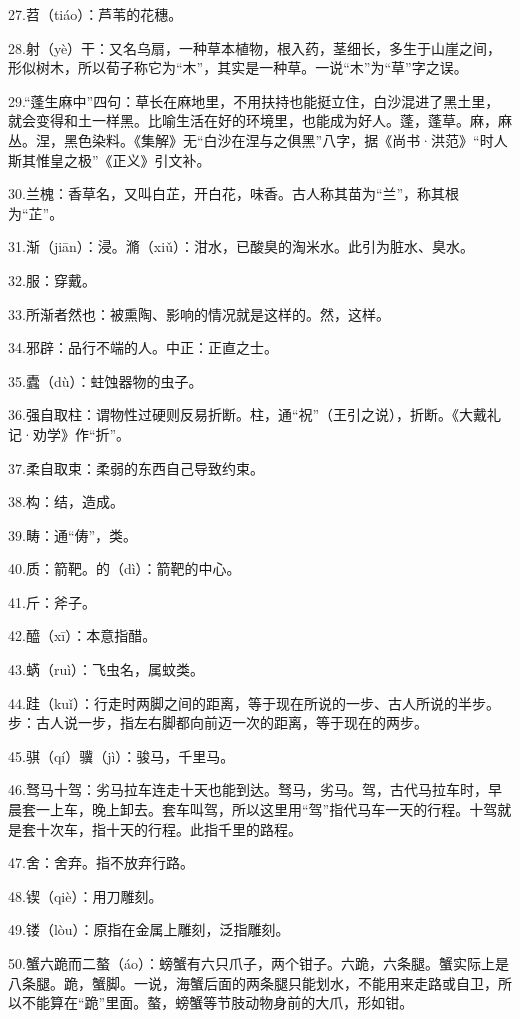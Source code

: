 \documentclass[letterpaper,12pt,english]{sphinxmanual}
\begin{document}
27.苕（tiáo）：芦苇的花穗。

28.射（yè）干：又名乌扇，一种草本植物，根入药，茎细长，多生于山崖之间，形似树木，所以荀子称它为“木”，其实是一种草。一说“木”为“草”字之误。

29.“蓬生麻中”四句：草长在麻地里，不用扶持也能挺立住，白沙混进了黑土里，就会变得和土一样黑。比喻生活在好的环境里，也能成为好人。蓬，蓬草。麻，麻丛。涅，黑色染料。《集解》无“白沙在涅与之俱黑”八字，据《尚书·洪范》“时人斯其惟皇之极”《正义》引文补。

30.兰槐：香草名，又叫白芷，开白花，味香。古人称其苗为“兰”，称其根为“芷”。

31.渐（jiān）：浸。滫（xiǔ）：泔水，已酸臭的淘米水。此引为脏水、臭水。

32.服：穿戴。

33.所渐者然也：被熏陶、影响的情况就是这样的。然，这样。

34.邪辟：品行不端的人。中正：正直之士。

35.蠹（dù）：蛀蚀器物的虫子。

36.强自取柱：谓物性过硬则反易折断。柱，通“祝”（王引之说），折断。《大戴礼记·劝学》作“折”。

37.柔自取束：柔弱的东西自己导致约束。

38.构：结，造成。

39.畴：通“俦”，类。

40.质：箭靶。的（dì）：箭靶的中心。

41.斤：斧子。

42.醯（xī）：本意指醋。

43.蜹（ruì）：飞虫名，属蚊类。

44.跬（kuǐ）：行走时两脚之间的距离，等于现在所说的一步、古人所说的半步。步：古人说一步，指左右脚都向前迈一次的距离，等于现在的两步。

45.骐（qí）骥（jì）：骏马，千里马。

46.驽马十驾：劣马拉车连走十天也能到达。驽马，劣马。驾，古代马拉车时，早晨套一上车，晚上卸去。套车叫驾，所以这里用“驾”指代马车一天的行程。十驾就是套十次车，指十天的行程。此指千里的路程。

47.舍：舍弃。指不放弃行路。

48.锲（qiè）：用刀雕刻。

49.镂（lòu）：原指在金属上雕刻，泛指雕刻。

50.蟹六跪而二螯（áo）：螃蟹有六只爪子，两个钳子。六跪，六条腿。蟹实际上是八条腿。跪，蟹脚。一说，海蟹后面的两条腿只能划水，不能用来走路或自卫，所以不能算在“跪”里面。螯，螃蟹等节肢动物身前的大爪，形如钳。
\end{document}
